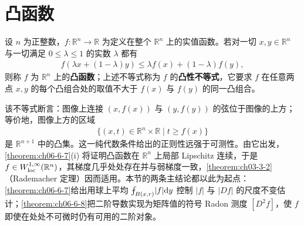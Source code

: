 \documentclass[../../main.tex]{subfiles}%
\begin{document}
\section{凸函数}\label{section:ch06-03}

\begin{definition}[凸函数]\label{definition:ch06-6-3}
设 $n$ 为正整数，$f:\mathbb{R}^n\to\mathbb{R}$ 为定义在整个 $\mathbb{R}^n$ 上的实值函数。若对一切 $x,y\in\mathbb{R}^n$ 与一切满足 $0\leqslant\lambda\leqslant1$ 的实数 $\lambda$ 都有
\begin{align*}
f(\lambda x+(1-\lambda)y)\leqslant\lambda f(x)+(1-\lambda)f(y),
\end{align*}
则称 $f$ 为 $\mathbb{R}^n$ 上的\textbf{凸函数}；上述不等式称为 $f$ 的\textbf{凸性不等式}，它要求 $f$ 在任意两点 $x,y$ 的每个凸组合处的取值不大于 $f(x)$ 与 $f(y)$ 的同一凸组合。
\end{definition}

\begin{remark}\label{remark:ch06-def-6-3-动机}
该不等式断言：图像上连接 $(x,f(x))$ 与 $(y,f(y))$ 的弦位于图像的上方；等价地，图像上方的区域
\begin{align*}
\{(x,t)\in\mathbb{R}^n\times\mathbb{R}\mid t\geqslant f(x)\}
\end{align*}
是 $\mathbb{R}^{n+1}$ 中的凸集。这一纯代数条件给出的正则性远强于可测性。由它出发，\cref{theorem:ch06-6-7}(i) 将证明凸函数在 $\mathbb{R}^n$ 上局部 Lipschitz 连续，于是 $f\in W^{1,\infty}_{\mathrm{loc}}(\mathbb{R}^n)$，其梯度几乎处处存在并与弱梯度一致，\cref{theorem:ch03-3-2}（Rademacher 定理）因而适用。本节的两条主结论都以此为起点：\cref{theorem:ch06-6-7}给出用球上平均 $\fint_{B(x,r)}\lvert f\rvert\diff y$ 控制 $\lvert f\rvert$ 与 $\lvert Df\rvert$ 的尺度不变估计；\cref{theorem:ch06-6-8}把二阶导数实现为矩阵值的符号 Radon 测度 $[D^{2}f]$，使 $f$ 即使在处处不可微时仍有可用的二阶对象。%
\end{remark}
\end{document}
